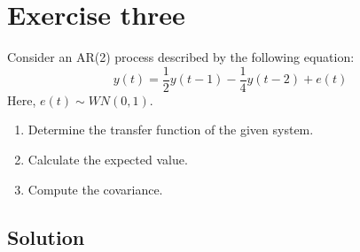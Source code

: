 \section{Exercise three}

Consider an AR(2) process described by the following equation:
\[y(t)=\dfrac{1}{2}y(t-1)-\dfrac{1}{4}y(t-2)+e(t)\]
Here, $e(t)\sim WN(0,1)$. 
\begin{enumerate}
    \item Determine the transfer function of the given system.
    \item Calculate the expected value.
    \item Compute the covariance.
\end{enumerate}

\subsection{Solution}
